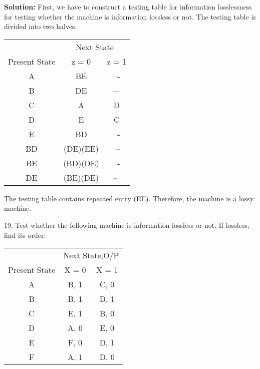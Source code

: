 \documentclass{article}
\begin{document}
\large{\textbf{Solution:}} First, we have to construct a testing table for information losslessness for testing whether the machine is information lossless or not. The testing table is divided into two halves.


\begin{center}
  \begin{tabular}{ccc}
\hline

\hline

\hline

\hline
 & \multicolumn{2}{c}{Next State}\\
 \cline{2-3}
Present State & z = 0 & z = 1\\
\hline
 A   &  BE  &   –- \\
 B   &  DE  &   –- \\
 C   &  A   &   D  \\
 D   &  E   &   C  \\
 E   &  BD  &   –- \\
\hline
 BD  &  (DE)(EE)  &   -–    \\
 BE  &  (BD)(DE)  &   –-    \\
 DE  &  (BE)(DE)  &   –-    \\
\hline

\hline

\hline

\hline

  \end{tabular}
\end{center}

The testing table contains repeated entry (EE). Therefore, the machine is a lossy machine.

$19.$ Test whether the following machine is information lossless or not. If lossless, find its order.

\begin{center}
  \begin{tabular}{ccc}
\hline

\hline

\hline

\hline
 & \multicolumn{2}{c}{Next State,O/P}\\
 \cline{2-3}
Present State & X = 0 & X = 1\\
\hline
  A    &    B, 1     &    C, 0 \\
  B    &    B, 1     &    D, 1 \\
  C    &    E, 1     &    B, 0 \\
  D    &    A, 0     &    E, 0 \\
  E    &    F, 0     &    D, 1 \\
  F    &    A, 1     &    D, 0 \\
\hline

\hline

\hline

\hline

  \end{tabular}
\end{center}
\end{document}
